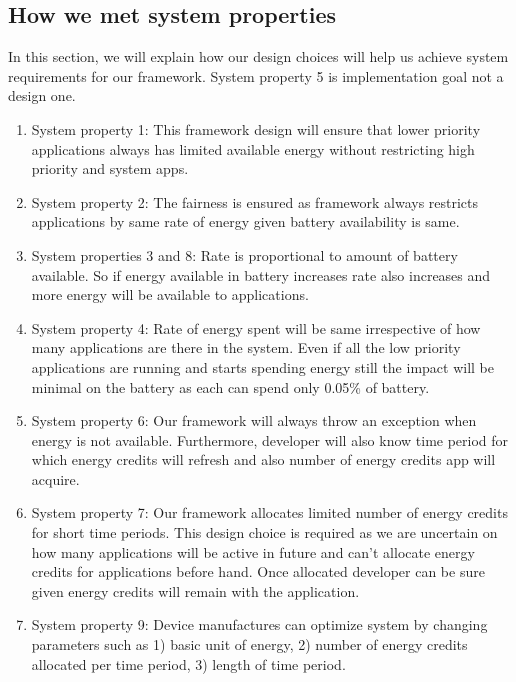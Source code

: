 \subsection{How we met system properties}


In this section, we will explain how our design choices will help us achieve system requirements for our framework. System property 5 is implementation goal not a design one.

\begin{enumerate}

\item  System property 1: This framework design will ensure that lower priority applications always has limited available energy without restricting high priority and system apps.

\item  System property 2: The fairness is ensured as framework always restricts applications by same rate of energy given battery availability is same. 

\item  System properties 3 and 8: Rate is proportional to amount of battery available. So if energy available in battery increases rate also increases and more energy will be available to applications.

\item System property 4: Rate of energy spent will be same irrespective of how many applications are there in the system. Even if all the low priority applications are running and starts spending energy still the impact will be minimal on the battery as each can spend only 0.05\% of battery.

\item System property 6: Our framework will always throw an exception when energy is not available. Furthermore, developer will also know time period for which energy credits will refresh and also number of energy credits app will acquire.

\item System property 7: Our framework allocates limited number of energy credits for short time periods. This design choice is required as we are uncertain on how many applications will be active in future and can't allocate energy credits for applications before hand. Once allocated developer can be sure given energy credits will remain with the application.

\item System property 9: Device manufactures can optimize system by changing parameters such as 1) basic unit of energy, 2) number of energy credits allocated per time period, 3) length of time period. 

\end{enumerate}

